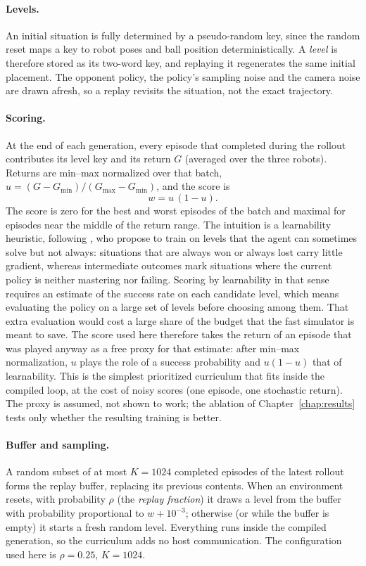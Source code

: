 \paragraph{Levels.}
An initial situation is fully determined by a pseudo-random key, since the random reset maps a key to robot poses
and ball position deterministically.  A \emph{level} is therefore stored as its two-word key, and replaying it regenerates the same initial placement.
The opponent policy, the policy's sampling noise and the camera noise are drawn afresh, so a replay revisits the situation, not the exact trajectory.

\paragraph{Scoring.}
At the end of each generation, every episode that completed during the rollout contributes its level key and its return
$G$ (averaged over the three robots).  Returns are min--max normalized over that batch,
$u = (G - G_{\min})/(G_{\max}-G_{\min})$, and the score is
\begin{equation}
    w = u\,(1-u) .
\end{equation}
The score is zero for the best and worst episodes of the batch and maximal for episodes near the middle of the
return range.  The intuition is a learnability heuristic, following \textcite{rutherford2024noregrets}, who propose to train on levels that the agent can sometimes solve but not always: situations that are always won or always lost carry little
gradient, whereas intermediate outcomes mark situations where the current policy is neither mastering nor failing.  Scoring by learnability in that sense requires an estimate of the success rate on each candidate level, which means evaluating the policy on a large set of levels before choosing among them.
That extra evaluation would cost a large share of the budget that the fast simulator is meant to save.  The score used here therefore takes the return of an episode that was played anyway as a free proxy for that estimate:
after min--max normalization, $u$ plays the role of a success probability and $u(1-u)$ that of learnability.  This is the simplest prioritized curriculum that fits inside the compiled loop, at the cost of noisy scores (one episode, one stochastic return).  The
proxy is assumed, not shown to work; the ablation of Chapter~\ref{chap:results} tests only whether the resulting training is better.

\paragraph{Buffer and sampling.}
A random subset of at most $K=1024$ completed episodes of the latest rollout forms the replay buffer, replacing its previous contents.
When an environment resets, with probability $\rho$ (the \emph{replay fraction}) it draws a level from the buffer with
probability proportional to $w + 10^{-3}$; otherwise (or while the buffer is empty) it starts a fresh random level.  Everything
runs inside the compiled generation, so the curriculum adds no host communication.  The configuration used here is $\rho = 0.25$, $K=1024$.

